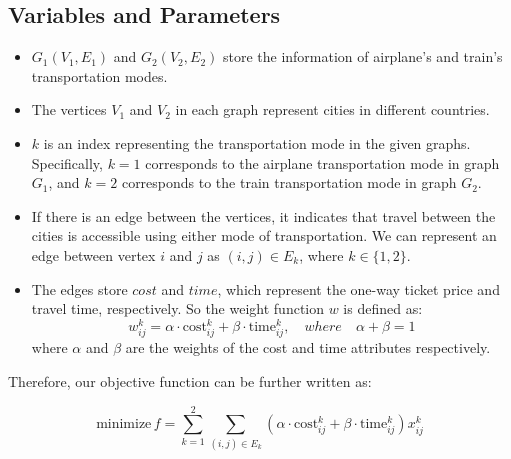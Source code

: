 \documentclass{article}
\begin{document}
\subsection*{Variables and Parameters}
\begin{itemize}
  \item $G_1(V_1, E_1)$ and $G_2(V_2, E_2)$ store the information of airplane's and train's transportation modes.
  \item The vertices $V_1$ and $V_2$ in each graph represent cities in different
        countries.
  \item $k$ is an index representing the transportation mode in the given graphs. Specifically, $k = 1$ corresponds to the airplane transportation mode in graph $G_1$, and $k = 2$ corresponds to the train transportation mode in graph $G_2$.
  \item If there is an edge between the vertices, it indicates that travel between the
        cities is accessible using either mode of transportation. We can represent an
        edge between vertex $i$ and $j$ as $(i, j) \in E_k$, where $k \in \{1, 2\}$.
  \item The edges store $cost$ and $time$, which represent the one-way ticket price and
        travel time, respectively. So the weight function $w$ is defined as:
        \begin{equation*}
          w_{ij}^k = \alpha \cdot \text{cost}_{ij}^k + \beta \cdot \text{time}_{ij}^k, \quad where \quad \alpha + \beta = 1
        \end{equation*}
        where $\alpha$ and $\beta$ are the weights of the cost and time attributes
        respectively.

\end{itemize}
Therefore, our objective function can be further written as:

\begin{equation*}
  \text{minimize}\, f = \sum_{k=1}^{2} \sum_{(i,j) \in E_k} (\alpha \cdot \text{cost}_{ij}^k + \beta \cdot \text{time}_{ij}^k) x_{ij}^k
\end{equation*}
\end{document}
